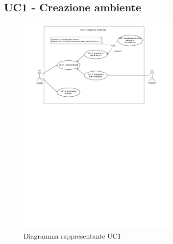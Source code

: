 \subsection{UC1 - Creazione ambiente}
\label{sub:uc1}


\begin{figure}[h]
    \centering
    \includegraphics[width=0.7\textwidth]{componenti/casi-duso/diagrammi/UC1.pdf}
    \caption{Diagramma rappresentante UC1}
    \label{fig:UC1}
\end{figure}


